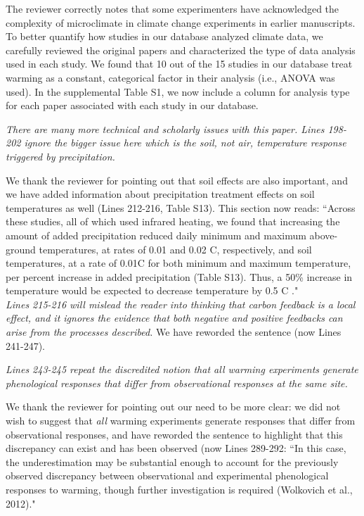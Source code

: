 \documentclass[11pt,a4paper]{letter}
\begin{document}
\begin{letter}{}
The reviewer correctly notes that some experimenters have acknowledged the complexity of microclimate in climate change experiments in earlier manuscripts. To better quantify how studies in our database analyzed climate data, we carefully reviewed the original papers and characterized the type of data analysis used in each study. We found that 10 out of the 15 studies in our database treat warming as a constant, categorical factor in their analysis (i.e., ANOVA was used). In the supplemental Table S1,   
we now include a column for analysis type for each paper associated with each study in our database. 
\par \emph{There are many more technical and scholarly issues with this paper.  Lines 198-202 ignore the bigger issue here which is the soil, not air, temperature response triggered by precipitation.}
\par We thank the reviewer for pointing out that soil effects are also important, and we have added information about precipitation treatment effects on soil temperatures as well (Lines 212-216, Table S13). This section now reads:
``Across these studies, all of which used infrared heating, we found that increasing the amount of added precipitation reduced daily minimum and maximum above-ground temperatures, at rates of 0.01 and 0.02 \degree C, respectively, and soil temperatures, at a rate of 0.01\degree C for both minimum and maximum temperature, per percent increase in added precipitation (Table S13). Thus, a 50\% increase in temperature would be expected to decrease temperature by 0.5 \degree C ."
\\
\emph  {Lines 215-216 will mislead the reader into thinking that carbon feedback is a local effect, and it ignores the evidence that both negative and positive feedbacks can arise from the processes described.}  
We have reworded the sentence (now Lines 241-247).

\emph {Lines 243-245 repeat the discredited notion that all warming experiments generate phenological responses that differ from observational responses at the same site. } 
\par We thank the reviewer for pointing out our need to be more clear: we did not wish to suggest that \emph{all} warming experiments generate responses that differ from observational responses, and have reworded the sentence to highlight that this discrepancy can exist and has been observed (now Lines 289-292:  ``In this
case, the underestimation may be substantial enough to account for the previously observed discrepancy between observational and experimental phenological responses to warming, though further investigation is required (Wolkovich et al., 2012)."


\end{letter}
\end{document}
